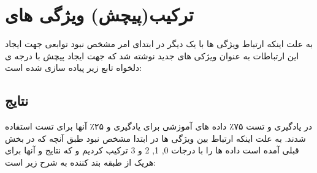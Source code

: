 \documentclass[10pt,a4paper]{article}
\begin{document}
\section{ترکیب(پیچش) ویژگی های}
به علت اینکه ارتباط ویژگی ها با یک دیگر در ابتدای امر مشخص نبود توابعی جهت ایجاد این ارتباطات به عنوان ویژکی های جدید نوشته شد که جهت ایجاد پیچش با درجه ی دلخواه تابع زیر پیاده سازی شده است:
\begin{latin}

\end{latin}

\begin{landscape}
\section{نتایج}
در یادگیری و تست ۷۵٪ داده های آموزشی برای یادگیری و ۲۵٪ آنها برای تست استفاده شدند. به علت اینکه ارتباط بین ویژگی ها در ابتدا مشخص نبود طبق آنچه که در بخش قبلی آمده است داده ها را با درجات 0, 1, 2 و 3 ترکیب کردیم و که نتایج
 و 
آنها برای هریک از طبقه بند کننده به شرح زیر است:


\end{landscape}
\end{document}
